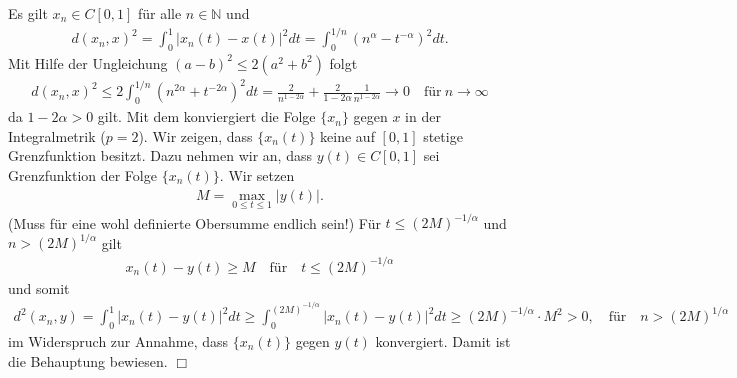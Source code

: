 \documentclass[letterpaper,10pt,english]{jupyterBook}
\begin{document}
Es gilt \(x_n \in C[0,1]\) für alle \(n\in\mathbb{N}\) und
\begin{equation*}
\begin{split}d(x_n,x)^2 = \int_0^1 |x_n(t)-x(t)|^2 dt = \int_0^{1/n} (n^\alpha - t^{-\alpha})^2 dt.\end{split}
\end{equation*}
Mit Hilfe der Ungleichung \((a-b)^2 \le 2 (a^2+b^2)\) folgt
\begin{equation*}
\begin{split}d(x_n,x)^2 \le 2 \int_0^{1/n} (n^{2\alpha} + t^{-2\alpha})^2 dt = \frac{2}{n^{1-2\alpha}} + \frac{2}{1-2\alpha} \frac{1}{n^{1-2\alpha}} \to 0 \quad \text{für}\ n\to\infty\end{split}
\end{equation*}
da \(1-2\alpha > 0\) gilt. Mit dem  konviergiert die Folge \(\{x_n\}\) gegen \(x\) in der Integralmetrik (\(p=2\)). Wir zeigen, dass \(\{x_n(t)\}\) keine auf \([0,1]\) stetige Grenzfunktion besitzt. Dazu nehmen wir an, dass \(y(t)\in C[0,1]\) sei Grenzfunktion der Folge \(\{x_n(t)\}\). Wir setzen
\begin{equation*}
\begin{split}M = \max_{0\le t\le 1} |y(t)|.\end{split}
\end{equation*}
(Muss für eine wohl definierte Obersumme endlich sein!)
Für \(t \le (2M)^{-1/\alpha}\) und \(n > (2M)^{1/\alpha}\) gilt
\begin{equation*}
\begin{split}x_n(t) - y(t) \ge M\quad \text{für}\quad t\le (2M)^{-1/\alpha}\end{split}
\end{equation*}
und somit
\begin{equation*}
\begin{split}d^2(x_n,y) = \int_0^1 |x_n(t)-y(t)|^2 dt \ge \int_0^{(2M)^{-1/\alpha}} |x_n(t)-y(t)|^2 dt \ge (2M)^{-1/\alpha}\cdot M^2 > 0, \quad \text{für}\quad n > (2M)^{1/\alpha}\end{split}
\end{equation*}
im Widerspruch zur Annahme, dass \(\{x_n(t)\}\) gegen \(y(t)\) konvergiert. Damit ist die Behauptung bewiesen. \(\Box\)
\end{document}
